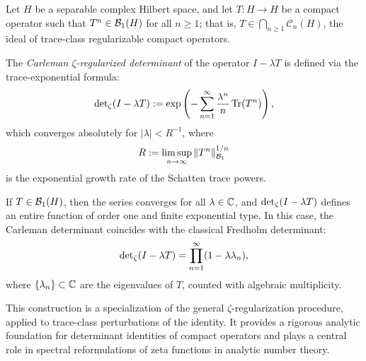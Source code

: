 \begin{definition}
\label{def:carleman_zeta_determinant}
Let \( H \) be a separable complex Hilbert space, and let \( T \colon H \to H \) be a compact operator such that \( T^n \in \mathcal{B}_1(H) \) for all \( n \ge 1 \); that is, \( T \in \bigcap_{n \ge 1} \mathcal{C}_n(H) \), the ideal of trace-class regularizable compact operators.

\medskip
\noindent
The \emph{Carleman \(\zeta\)-regularized determinant} of the operator \( I - \lambda T \) is defined via the trace-exponential formula:
\[
\det\nolimits_{\zeta}(I - \lambda T) := \exp\left( - \sum_{n=1}^\infty \frac{\lambda^n}{n} \operatorname{Tr}(T^n) \right),
\]
which converges absolutely for \( |\lambda| < R^{-1} \), where
\[
R := \limsup_{n \to \infty} \|T^n\|_{\mathcal{B}_1}^{1/n}
\]
is the exponential growth rate of the Schatten trace powers.

\medskip
\noindent
If \( T \in \mathcal{B}_1(H) \), then the series converges for all \( \lambda \in \mathbb{C} \), and \( \det\nolimits_{\zeta}(I - \lambda T) \) defines an entire function of order one and finite exponential type. In this case, the Carleman determinant coincides with the classical Fredholm determinant:
\[
\det\nolimits_{\zeta}(I - \lambda T)
= \prod_{n=1}^\infty (1 - \lambda \lambda_n),
\]
where \( \{ \lambda_n \} \subset \mathbb{C} \) are the eigenvalues of \( T \), counted with algebraic multiplicity.

\medskip
\noindent
This construction is a specialization of the general \(\zeta\)-regularization procedure, applied to trace-class perturbations of the identity. It provides a rigorous analytic foundation for determinant identities of compact operators and plays a central role in spectral reformulations of zeta functions in analytic number theory.
\end{definition}

